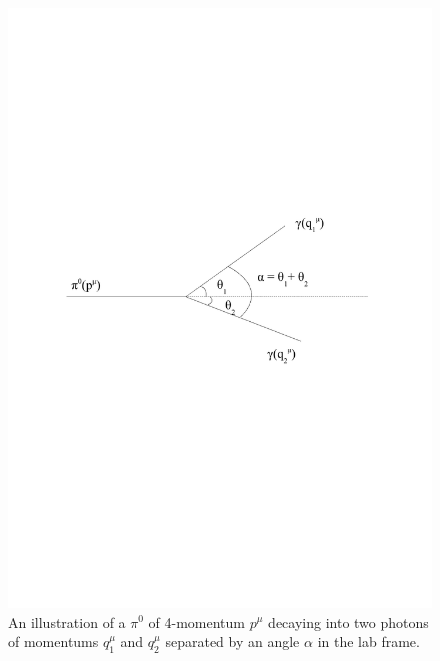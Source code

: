\begin{figure}[htbp]
\begin{center}
  	\includegraphics[width=120mm]{Chapter4/figures/piZeroDrawing.pdf}
		\caption{An illustration of a $\pi^{0}$ of 4-momentum $p^{\mu}$ decaying into two photons of momentums $q_{1}^{\mu}$ and $q_{2}^{\mu}$ separated by an angle $\alpha$ in the lab frame.}
	\label{fig:piZeroDecay}
\end{center}
\end{figure}

